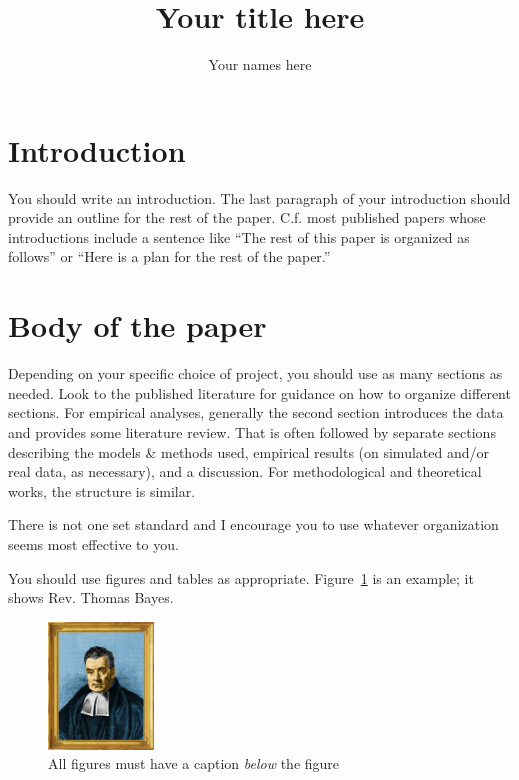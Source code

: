 \documentclass[12pt, twoside]{article}
\title{Your title here}
\author{Your names here}
\begin{document}
\onehalfspacing %
\maketitle

\section{Introduction}
You should write an introduction.
The last paragraph of your introduction should provide an outline for the rest of the paper. 
C.f. most published papers whose introductions include a sentence like ``The rest of this paper is organized as follows'' or ``Here is a plan for the rest of the paper.''

\section{Body of the paper}

Depending on your specific choice of project, you should use as many sections as needed.
Look to the published literature for guidance on how to organize different sections. 
For empirical analyses, generally the second section introduces the data and provides some literature review. 
That is often followed by separate sections describing the models \& methods used, empirical results (on simulated and/or real data, as necessary), and a discussion.
For methodological and theoretical works, the structure is similar.

There is not one set standard and I encourage you to use whatever organization seems most effective to you. 

You should use figures and tables as appropriate. 
Figure~\ref{fig:bayes} is an example; it shows Rev. Thomas Bayes.

\begin{figure}[H] %
\centering
\includegraphics[width = 0.25\textwidth]{bayes} %
\caption{All figures must have a caption \textit{below} the figure}
\label{fig:bayes} %
\end{figure}
\end{document}
